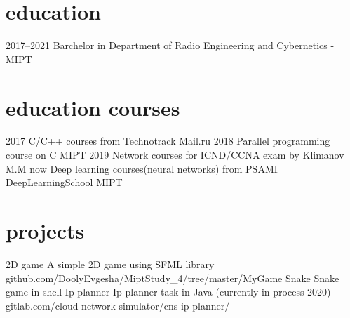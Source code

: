 \documentclass[]{cv-style}          %
\begin{document}
\section{education}

\begin{entrylist}
\entry
{2017--2021}
{Barchelor {\normalfont in Department of Radio Engineering and Cybernetics - MIPT}}
{}
{\vspace{-0.3cm}}
\end{entrylist}


\section{education courses}

\begin{entrylist}
\entry
{2017}
{C/C++ courses from Technotrack}
{Mail.ru}
{\vspace{-0.3cm}}
\entry
{2018}
{Parallel programming course on C}
{MIPT}
{\vspace{-0.3cm}}
\entry
{2019}
{Network courses for ICND/CCNA exam}
{by Klimanov M.M}
{\vspace{-0.3cm}}
\entry
{now}
{Deep learning courses(neural networks) from PSAMI}
{DeepLearningSchool MIPT}
{\vspace{-0.3cm}}
\end{entrylist}


\section{projects}

\begin{entrylist}
\entry
{2D game}
{A simple 2D game using SFML library}
{}
{github.com/DoolyEvgesha/MiptStudy\_4/tree/master/MyGame}
\entry
{Snake}
{Snake game in shell}
{}
{}
\entry
{Ip planner}
{Ip planner task in Java (currently in process-2020)}
{}
{gitlab.com/cloud-network-simulator/cns-ip-planner/}
\end{entrylist}
\end{document}
